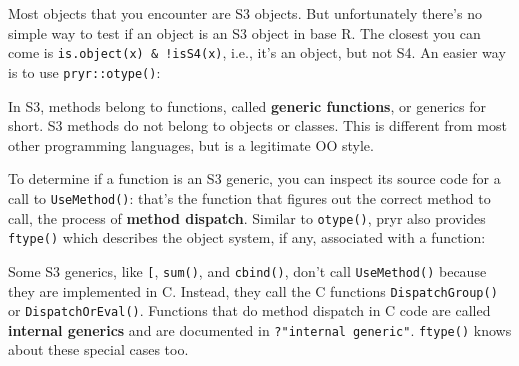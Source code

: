Most objects that you encounter are S3 objects. But unfortunately
there's no simple way to test if an object is an S3 object in base R.
The closest you can come is \texttt{is.object(x) \& !isS4(x)}, i.e.,
it's an object, but not S4. An easier way is to use
\texttt{pryr::otype()}: 

\begin{Shaded}
\begin{Highlighting}[]

\StringTok{ }\NormalTok{(} \NormalTok{:}\NormalTok{, } \NormalTok{letters[}\NormalTok{:}\NormalTok{])}
\end{Highlighting}
\end{Shaded}

In S3, methods belong to functions, called \textbf{generic functions},
or generics for short. S3 methods do not belong to objects or classes.
This is different from most other programming languages, but is a
legitimate OO style. 
 

To determine if a function is an S3 generic, you can inspect its source
code for a call to \texttt{UseMethod()}: that's the function that
figures out the correct method to call, the process of \textbf{method
dispatch}. Similar to \texttt{otype()}, pryr also provides
\texttt{ftype()} which describes the object system, if any, associated
with a function: 

\begin{Shaded}
\begin{Highlighting}[]
\end{Highlighting}
\end{Shaded}

Some S3 generics, like \texttt{{[}}, \texttt{sum()}, and
\texttt{cbind()}, don't call \texttt{UseMethod()} because they are
implemented in C. Instead, they call the C functions
\texttt{DispatchGroup()} or \texttt{DispatchOrEval()}. Functions that do
method dispatch in C code are called \textbf{internal generics} and are
documented in \texttt{?"internal generic"}. \texttt{ftype()} knows about
these special cases too.

